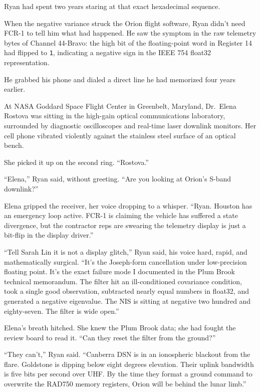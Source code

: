 \documentclass[12pt,twoside,openright]{book}
\begin{document}
Ryan had spent two years staring at that exact hexadecimal sequence.

When the negative variance struck the Orion flight software, Ryan didn't
need FCR-1 to tell him what had happened. He saw the symptom in the raw
telemetry bytes of Channel 44-Bravo: the high bit of the floating-point
word in Register 14 had flipped to \passthrough{\lstinline!1!},
indicating a negative sign in the IEEE 754 float32 representation.

He grabbed his phone and dialed a direct line he had memorized four
years earlier.

At NASA Goddard Space Flight Center in Greenbelt, Maryland, Dr.~Elena
Rostova was sitting in the high-gain optical communications laboratory,
surrounded by diagnostic oscilloscopes and real-time laser downlink
monitors. Her cell phone vibrated violently against the stainless steel
surface of an optical bench.

She picked it up on the second ring. ``Rostova.''

``Elena,'' Ryan said, without greeting. ``Are you looking at Orion's
S-band downlink?''

Elena gripped the receiver, her voice dropping to a whisper. ``Ryan.
Houston has an emergency loop active. FCR-1 is claiming the vehicle has
suffered a state divergence, but the contractor reps are swearing the
telemetry display is just a bit-flip in the display driver.''

``Tell Sarah Lin it is not a display glitch,'' Ryan said, his voice
hard, rapid, and mathematically surgical. ``It's the Joseph-form
cancellation under low-precision floating point. It's the exact failure
mode I documented in the Plum Brook technical memorandum. The filter hit
an ill-conditioned covariance condition, took a single good observation,
subtracted nearly equal numbers in float32, and generated a negative
eigenvalue. The NIS is sitting at negative two hundred and eighty-seven.
The filter is wide open.''

Elena's breath hitched. She knew the Plum Brook data; she had fought the
review board to read it. ``Can they reset the filter from the ground?''

``They can't,'' Ryan said. ``Canberra DSN is in an ionospheric blackout
from the flare. Goldstone is dipping below eight degrees elevation.
Their uplink bandwidth is five bits per second over UHF. By the time
they format a ground command to overwrite the RAD750 memory registers,
Orion will be behind the lunar limb.''
\end{document}
